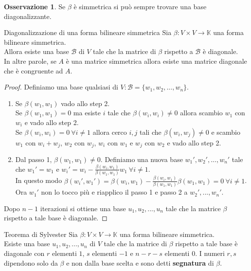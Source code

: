 \documentclass[a4paper]{article}
\theoremstyle{definition}
\newtheorem*{oss}{Osservazione}
\begin{document}
	\begin{oss}
		Se $\beta$ è simmetrica si può sempre trovare una base diagonalizzante.
	\end{oss}

	\begin{teo}{Diagonalizzazione di una forma bilineare simmetrica}{}
		Sia $\beta: V \times V \to \mathbb{K}$ una forma bilineare simmetrica. \\
		Allora esiste una base $\mathcal{B}$ di $V$ tale che la matrice di $\beta$ rispetto a $\mathcal{B}$ è diagonale. \\
		In altre parole, se $A$ è una matrice simmetrica allora esiste una matrice diagonale che è congruente ad $A$.
	\end{teo}
	\begin{proof}
		Definiamo una base qualsiasi di $V: \mathcal{B} = \{w_1, w_2, ..., w_n\}$. \\
		\begin{enumerate}
			\item Se $\beta(w_1, w_1)$ vado allo step 2. \\
			Se $\beta(w_1, w_1) = 0$ ma esiste $i$ tale che $\beta(w_i, w_i) \ne 0$ allora scambio $w_1$ con $w_i$ e vado allo step 2. \\
			Se $\beta(w_i, w_i) = 0 \ \forall i \ne 1$ allora cerco $i, j$ tali che $\beta(w_i, w_j) \ne 0$ e scambio $w_1$ con $w_i + w_j$, $w_2$ con $w_j$, $w_i$ con $w_1$ e $w_j$ con $w_2$ e vado allo step 2.
			\item Dal passo 1, $\beta(w_1, w_1) \ne 0$. Definiamo una nuova base $w_1', w_2', ..., w_n'$ tale che $w_1' = w_1$ e $w_i' = w_i - \frac{\beta(w_i, w_1)}{\beta(w_1, w_1)}w_1 \ \forall i \ne 1$. \\
			In questo modo $\beta(w_i', w_1') = \beta(w_i, w_1) - \frac{\beta(w_i, w_1)}{\beta(w_1, w_1)}\beta(w_1, w_1) = 0 \ \forall i \ne 1$. \\
			Ora $w_1'$ non lo tocco più e riapplico il passo 1 e passo 2 a $w_2', ..., w_n'$.
		\end{enumerate}
		Dopo $n - 1$ iterazioni si ottiene una base $u_1, u_2, ..., u_n$ tale che la matrice $\beta$ rispetto a tale base è diagonale.
	\end{proof}

	\begin{teo}{Teorema di Sylvester}{}
		Sia $\beta: V \times V \to \mathbb{K}$ una forma bilineare simmetrica. \\
		Esiste una base $u_1, u_2, ..., u_n$ di $V$ tale che la matrice di $\beta$ rispetto a tale base è diagonale con $r$ elementi $1$, $s$ elementi $-1$ e $n - r - s$ elementi $0$.
		I numeri $r, s$ dipendono solo da $\beta$ e non dalla base scelta e sono detti \textbf{segnatura} di $\beta$.
	\end{teo}
\end{document}
